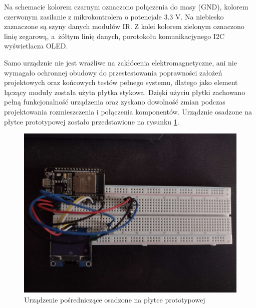 \documentclass[12pt,twoside]{article}
\begin{document}
Na schemacie kolorem czarnym oznaczono połączenia do masy (GND), kolorem czerwonym zasilanie z mikrokontrolera o potencjale 3.3 V. Na niebiesko zaznaczone są szyny danych modułów IR. Z kolei kolorem zielonym oznaczono linię zegarową, a~żółtym linię danych, porotokołu komunikacjynego I2C wyświetlacza OLED.

Samo urządznie nie jest wrażliwe na zakłócenia elektromagnetyczne, ani nie wymagało ochronnej obudowy do przestestowania poprawności założeń projektowych oraz końcowych testów pełnego systemu, dlatego jako element łączący moduły została użyta płytka stykowa. Dzięki użyciu płytki zachowano pełną funkcjonalność urządzenia oraz zyskano dowolność zmian podczas projektowania rozmieszczenia i połączenia komponentów. Urządznie osadzone na płytce prototypowej zostało przedstawione na rysunku \ref*{Fig:deviceOnBoard}.
\begin{figure}[ht]
   \centering
   \includegraphics[width=12cm]{images/deviceOnBoard.jpg}
   \caption{Urządzenie pośredniczące osadzone na płytce prototypowej}
   \label{Fig:deviceOnBoard}
\end{figure}
\end{document}
